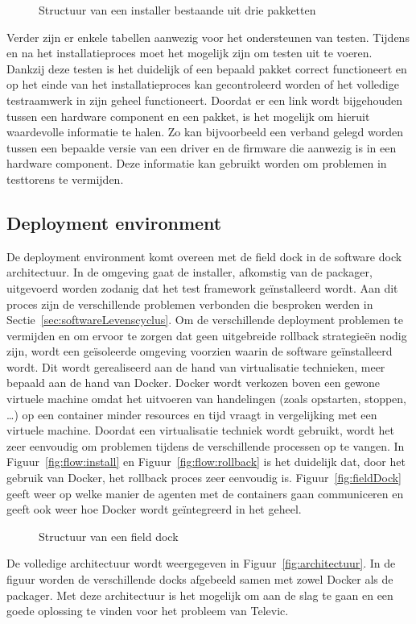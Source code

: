 \begin{figure}[!ht]
\centering
{}
\caption{Structuur van een installer bestaande uit drie pakketten}
\label{fig:installerStructuur}
\end{figure}

Verder zijn er enkele tabellen aanwezig voor het ondersteunen van testen.
Tijdens en na het installatieproces moet het mogelijk zijn om testen uit te voeren.
Dankzij deze testen is het duidelijk of een bepaald pakket correct functioneert en op het einde van het installatieproces kan gecontroleerd worden of het volledige testraamwerk in zijn geheel functioneert.
Doordat er een link wordt bijgehouden tussen een hardware component en een pakket, is het mogelijk om hieruit waardevolle informatie te halen.
Zo kan bijvoorbeeld een verband gelegd worden tussen een bepaalde versie van een driver en de firmware die aanwezig is in een hardware component.
Deze informatie kan gebruikt worden om problemen in testtorens te vermijden.

\subsection{Deployment environment}
De deployment environment komt overeen met de field dock in de software dock architectuur.
In de omgeving gaat de installer, afkomstig van de packager, uitgevoerd worden zodanig dat het test framework geïnstalleerd wordt.
Aan dit proces zijn de verschillende problemen verbonden die besproken werden in Sectie~\vref{sec:softwareLevenscyclus}.
Om de verschillende deployment problemen te vermijden en om ervoor te zorgen dat geen uitgebreide rollback strategieën nodig zijn, wordt een geïsoleerde omgeving voorzien waarin de software geïnstalleerd wordt. 
Dit wordt gerealiseerd aan de hand van virtualisatie technieken, meer bepaald aan de hand van Docker.
Docker wordt verkozen boven een gewone virtuele machine omdat het uitvoeren van handelingen (zoals opstarten, stoppen, \ldots) op een container minder resources en tijd vraagt in vergelijking met een virtuele machine.
Doordat een virtualisatie techniek wordt gebruikt, wordt het zeer eenvoudig om problemen tijdens de verschillende processen op te vangen.
In Figuur~\vref{fig:flow:install} en Figuur~\vref{fig:flow:rollback} is het duidelijk dat, door het gebruik van Docker, het rollback proces zeer eenvoudig is.
Figuur~\vref{fig:fieldDock} geeft weer op welke manier de agenten met de containers gaan communiceren en geeft ook weer hoe Docker wordt geïntegreerd in het geheel.

\begin{figure}[!ht]
\centering
{}
\caption{Structuur van een field dock}
\label{fig:fieldDock}
\end{figure}

De volledige architectuur wordt weergegeven in Figuur~\vref{fig:architectuur}.
In de figuur worden de verschillende docks afgebeeld samen met zowel Docker als de packager.
Met deze architectuur is het mogelijk om aan de slag te gaan en een goede oplossing te vinden voor het probleem van Televic.

